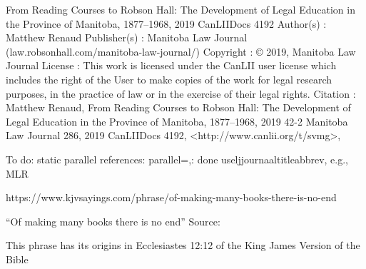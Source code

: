 From Reading Courses to Robson Hall: The Development of Legal Education in the Province of Manitoba, 1877–1968, 2019 CanLIIDocs 4192
Author(s) : 	Matthew Renaud
Publisher(s) : 	Manitoba Law Journal (law.robsonhall.com/manitoba-law-journal/)
Copyright : 	© 2019, Manitoba Law Journal
License : 	This work is licensed under the CanLII user license which includes the right of the User to make copies of the work for legal research purposes, in the practice of law or in the exercise of their legal rights.
Citation : 	Matthew Renaud, From Reading Courses to Robson Hall: The Development of Legal Education in the Province of Manitoba, 1877–1968, 2019 42-2 Manitoba Law Journal 286, 2019 CanLIIDocs 4192, <http://www.canlii.org/t/svmg>,




To do:
static parallel references: parallel={},: done
useljjournaaltitleabbrev, e.g., MLR


https://www.kjvsayings.com/phrase/of-making-many-books-there-is-no-end

“Of making many books there is no end”
Source:

This phrase has its origins in Ecclesiastes 12:12 of the King James Version of the Bible

